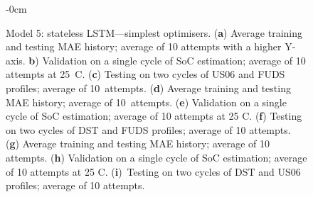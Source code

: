 \begin{figure}[H]
\begin{adjustwidth}{-\extralength}{0cm}
\begin{subfigure}[b]{0.425\textwidth}
    \end{subfigure}
    \hfill
    \begin{subfigure}[b]{0.425\textwidth}
        \centering
        
        \caption{\centering\vspace{+2pt}}
    \end{subfigure}
    \hfill
    \begin{subfigure}[b]{0.425\textwidth}
        \centering
        
        \caption{\centering\vspace{+2pt}}
    \end{subfigure}
    \end{adjustwidth}
    \caption{Model 5: stateless LSTM---simplest optimisers. (\textbf{a}) Average training and testing MAE history; average of 10 attempts with a higher Y-axis. \textbf{b}) Validation on a single cycle of SoC estimation; average of 10 attempts at 25~\textdegree{}C. (\textbf{c}) Testing on two cycles of US06 and FUDS profiles; average of 10~attempts. (\textbf{d}) Average training and testing MAE history; average of 10~attempts. (\textbf{e}) Validation on a single cycle of SoC estimation; average of 10 attempts at 25 \textdegree{}C. (\textbf{f}) Testing on two cycles of DST and FUDS profiles; average of 10 attempts. (\textbf{g}) Average training and testing MAE history; average of 10 attempts. (\textbf{h}) Validation on a single cycle of SoC estimation; average of 10 attempts at 25 \textdegree{}C. (\textbf{i})~Testing on two cycles of DST and US06 profiles; average of 10 attempts.}
    \label{fig:Model-5res}
\end{figure}
\clearpage